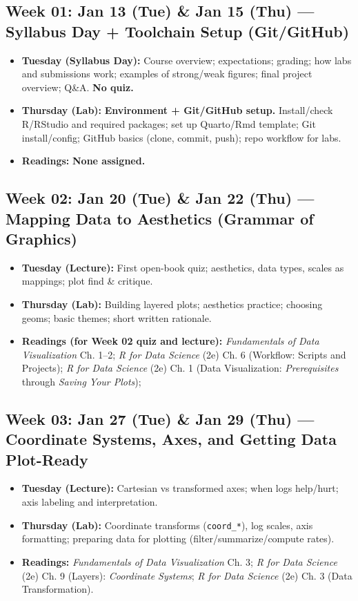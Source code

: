 \documentclass[letterpaper,11pt]{article}
\newcommand{\FDV}{\emph{Fundamentals of Data Visualization}}
\newcommand{\RDS}{\emph{R for Data Science} (2e)}
\newcommand{\compresslist}{
\setlength{\itemsep}{1pt}
\setlength{\parskip}{0pt}
\setlength{\parsep}{0pt}
}
\begin{document}
\subsection*{Week 01: Jan 13 (Tue) \& Jan 15 (Thu) --- \textbf{Syllabus Day + Toolchain Setup (Git/GitHub)}}
\begin{itemize}\compresslist
\item \textbf{Tuesday (Syllabus Day):} Course overview; expectations; grading; how labs and submissions work; examples of strong/weak figures; final project overview; Q\&A. \textbf{No quiz.}
\item \textbf{Thursday (Lab):} \textbf{Environment + Git/GitHub setup.} Install/check R/RStudio and required packages; set up Quarto/Rmd template; Git install/config; GitHub basics (clone, commit, push); repo workflow for labs.
\item \textbf{Readings:} \textbf{None assigned.}
\end{itemize}

\subsection*{Week 02: Jan 20 (Tue) \& Jan 22 (Thu) --- Mapping Data to Aesthetics (Grammar of Graphics)}
\begin{itemize}\compresslist
\item \textbf{Tuesday (Lecture):} First open-book quiz; aesthetics, data types, scales as mappings; plot find \& critique.
\item \textbf{Thursday (Lab):} Building layered plots; aesthetics practice; choosing geoms; basic themes; short written rationale.
\item \textbf{Readings (for Week 02 quiz and lecture):} 
\FDV{} Ch. 1--2; 
\RDS{} Ch. 6 (Workflow: Scripts and Projects); 
\RDS{} Ch. 1 (Data Visualization: \emph{Prerequisites} through \emph{Saving Your Plots}); 
\end{itemize}

\subsection*{Week 03: Jan 27 (Tue) \& Jan 29 (Thu) --- Coordinate Systems, Axes, and Getting Data Plot-Ready}
\begin{itemize}\compresslist
\item \textbf{Tuesday (Lecture):} Cartesian vs transformed axes; when logs help/hurt; axis labeling and interpretation.
\item \textbf{Thursday (Lab):} Coordinate transforms (\texttt{coord\_*}), log scales, axis formatting; preparing data for plotting (filter/summarize/compute rates).
\item \textbf{Readings:} \FDV{} Ch. 3; \RDS{} Ch. 9 (Layers): \emph{Coordinate Systems}; \RDS{} Ch. 3 (Data Transformation).
\end{itemize}
\end{document}
